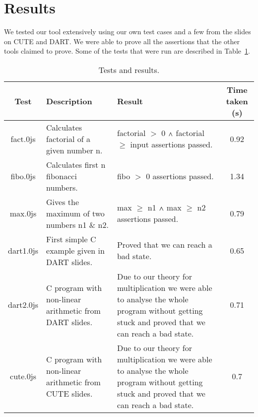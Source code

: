 \section{Results}
We tested our tool extensively using our own test cases and a few from the slides on CUTE and DART. We were able to prove all the assertions that the other tools claimed to prove. Some of the tests that were run are described in Table~\ref{tab:tests}.
\begin{table}
\begin{center}
\begin{tabular}{|c|p{3cm}|p{3cm}|c|}
\hline
	Test & Description & Result & Time taken (s)\\
\hline
	fact.0js & Calculates factorial of a given number n. & factorial $>$ 0 $\land$ factorial $\ge$ input assertions passed. & 0.92\\
\hline
	fibo.0js & Calculates first n fibonacci numbers. & fibo $>$ 0 assertions passed.& 1.34\\
\hline
	max.0js & Gives the maximum of two numbers n1 \& n2. & max $\ge$ n1 $\land$ max $\ge$ n2 assertions passed.& 0.79\\
\hline
	dart1.0js & First simple C example given in DART slides. & Proved that we can reach a bad state. & 0.65\\
\hline
	dart2.0js & C program with non-linear arithmetic from DART slides. & Due to our theory for multiplication we were able to analyse the whole program without getting stuck and proved that we can reach a bad state. & 0.71\\
\hline
	cute.0js & C program with non-linear arithmetic from CUTE slides. & Due to our theory for multiplication we were able to analyse the whole program without getting stuck and proved that we can reach a bad state.& 0.7\\
\hline
\end{tabular}
\end{center}
\caption{Tests and results.}
\label{tab:tests}
\end{table}


